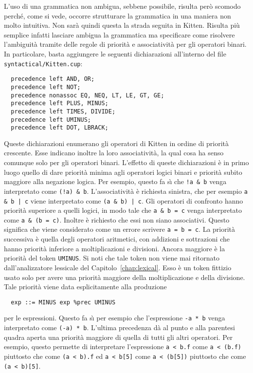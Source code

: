 L'uso di una grammatica non ambigua, sebbene possibile, risulta per\`o
scomodo perch\'e, come si vede, occorre strutturare la grammatica in una
maniera non molto intuitiva. Non sar\`a quindi questa la strada seguita
in Kitten. Risulta pi\`u semplice infatti lasciare ambigua la grammatica
ma specificare come risolvere l'ambiguit\`a tramite delle regole
di priorit\`a e associativit\`a per gli operatori binari.
In particolare, basta aggiungere le seguenti dichiarazioni all'interno del
file \texttt{syntactical/Kitten.cup}:
%
\begin{verbatim}
  precedence left AND, OR;
  precedence left NOT;
  precedence nonassoc EQ, NEQ, LT, LE, GT, GE;
  precedence left PLUS, MINUS;
  precedence left TIMES, DIVIDE;
  precedence left UMINUS;
  precedence left DOT, LBRACK;
\end{verbatim}
%
Queste dichiarazioni enumerano gli operatori di Kitten in ordine di
priorit\`a crescente. Esse indicano inoltre la loro associativit\`a,
la qual cosa ha senso comunque solo per gli operatori binari.
L'effetto di queste dichiarazioni \`e in primo luogo quello di dare priorit\`a
minima agli operatori logici binari e priorit\`a subito maggiore alla
negazione logica. Per esempio, questo fa s\`{\i} che
\texttt{!a \& b} venga interpretato come \texttt{(!a) \& b}.
L'associativit\`a \`e richiesta sinistra, \cosi che per esempio
\texttt{a \& b | c} viene interpretato come \texttt{(a \& b) | c}.
Gli operatori di confronto hanno priorit\`a superiore a quelli
logici, in modo tale che \texttt{a \& b = c} venga interpretato come
\texttt{a \& (b = c)}. Inoltre \`e richiesto che essi non siano
associativi. Questo significa che viene considerato come un errore
scrivere \texttt{a = b = c}. La priorit\`a successiva \`e quella
degli operatori aritmetici, con addizioni e sottrazioni che hanno
priorit\`a inferiore a moltiplicazioni e divisioni. Ancora maggiore
\`e la priorit\`a del token \texttt{UMINUS}. Si noti che tale token non
viene mai ritornato dall'analizzatore lessicale del
Capitolo~\ref{chap:lexical}. Esso \`e un token
fittizio usato solo per avere una priorit\`a maggiore della moltiplicazione
e della divisione. Tale priorit\`a viene data esplicitamente alla produzione
%
\begin{verbatim}
  exp ::= MINUS exp %prec UMINUS
\end{verbatim}
%
per le espressioni. Questo fa s\`{\i} per esempio che l'espressione
\texttt{-a * b} venga interpretato come \texttt{(-a) * b}.
%
L'ultima precedenza d\`a al punto e alla parentesi quadra
aperta una priorit\`a maggiore
di quella di tutti gli altri operatori. Per esempio, questo permette
di interpretare l'espressione
\texttt{a < b.f} come \texttt{a < (b.f)} piuttosto che
come \texttt{(a < b).f} ed \texttt{a < b[5]} come \texttt{a < (b[5])}
piuttosto che come \texttt{(a < b)[5]}.

